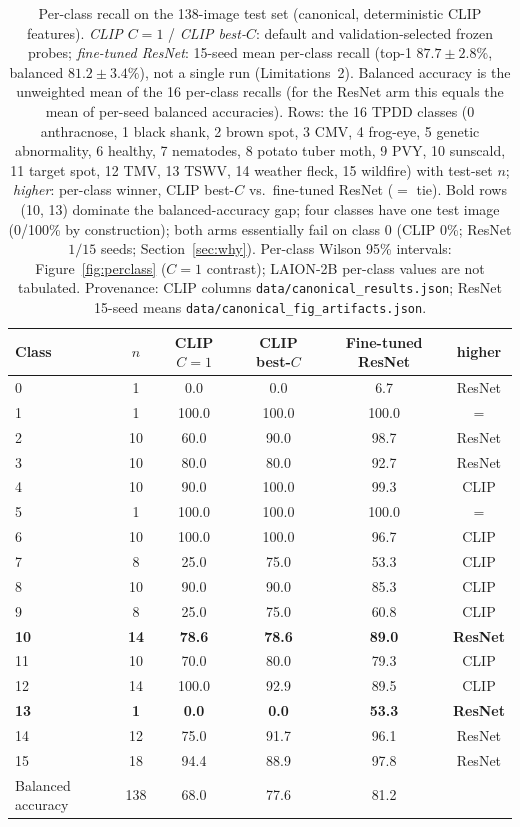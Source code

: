 \documentclass[10pt,a4paper]{article}
\begin{document}
\begin{table}[!ht]
\centering
\caption{Per-class recall on the 138-image test set (canonical, deterministic CLIP features). \emph{CLIP $C{=}1$} / \emph{CLIP best-$C$}: default and validation-selected frozen probes; \emph{fine-tuned ResNet}: 15-seed mean per-class recall (top-1 $87.7\pm2.8\%$, balanced $81.2\pm3.4\%$), not a single run (Limitations~2). Balanced accuracy is the unweighted mean of the 16 per-class recalls (for the ResNet arm this equals the mean of per-seed balanced accuracies). Rows: the 16 TPDD classes (0 anthracnose, 1 black shank, 2 brown spot, 3 CMV, 4 frog-eye, 5 genetic abnormality, 6 healthy, 7 nematodes, 8 potato tuber moth, 9 PVY, 10 sunscald, 11 target spot, 12 TMV, 13 TSWV, 14 weather fleck, 15 wildfire) with test-set $n$; \emph{higher}: per-class winner, CLIP best-$C$ vs.\ fine-tuned ResNet ($=$ tie). Bold rows (10, 13) dominate the balanced-accuracy gap; four classes have one test image (0/100\% by construction); both arms essentially fail on class 0 (CLIP 0\%; ResNet $1/15$ seeds; Section~\ref{sec:why}). Per-class Wilson 95\% intervals: Figure~\ref{fig:perclass} ($C{=}1$ contrast); LAION-2B per-class values are not tabulated. Provenance: CLIP columns \texttt{data/canonical\_results.json}; ResNet 15-seed means \texttt{data/canonical\_fig\_artifacts.json}.}
\label{tab:perclass}
\begin{tabular}{lccccc}
\toprule
Class & $n$ & CLIP $C{=}1$ & CLIP best-$C$ & Fine-tuned ResNet & higher \\
\midrule
0 & 1 & 0.0 & 0.0 & 6.7 & ResNet \\
1 & 1 & 100.0 & 100.0 & 100.0 & $=$ \\
2 & 10 & 60.0 & 90.0 & 98.7 & ResNet \\
3 & 10 & 80.0 & 80.0 & 92.7 & ResNet \\
4 & 10 & 90.0 & 100.0 & 99.3 & CLIP \\
5 & 1 & 100.0 & 100.0 & 100.0 & $=$ \\
6 & 10 & 100.0 & 100.0 & 96.7 & CLIP \\
7 & 8 & 25.0 & 75.0 & 53.3 & CLIP \\
8 & 10 & 90.0 & 90.0 & 85.3 & CLIP \\
9 & 8 & 25.0 & 75.0 & 60.8 & CLIP \\
\textbf{10} & \textbf{14} & \textbf{78.6} & \textbf{78.6} & \textbf{89.0} & \textbf{ResNet} \\
11 & 10 & 70.0 & 80.0 & 79.3 & CLIP \\
12 & 14 & 100.0 & 92.9 & 89.5 & CLIP \\
\textbf{13} & \textbf{1} & \textbf{0.0} & \textbf{0.0} & \textbf{53.3} & \textbf{ResNet} \\
14 & 12 & 75.0 & 91.7 & 96.1 & ResNet \\
15 & 18 & 94.4 & 88.9 & 97.8 & ResNet \\
Balanced accuracy & 138 & 68.0 & 77.6 & 81.2 & \\
\bottomrule
\end{tabular}
\end{table}
\end{document}
